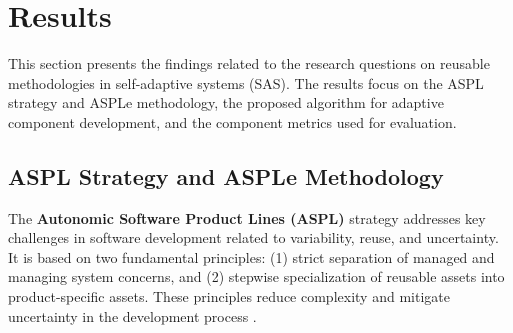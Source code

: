 \documentclass[a4paper,10pt]{article}
\begin{document}








\section{Results}

This section presents the findings related to the research questions on reusable methodologies in self-adaptive systems (SAS). The results focus on the ASPL strategy and ASPLe methodology, the proposed algorithm for adaptive component development, and the component metrics used for evaluation. 

\subsection{ASPL Strategy and ASPLe Methodology}

The \textbf{Autonomic Software Product Lines (ASPL)} strategy addresses key challenges in software development related to variability, reuse, and uncertainty. It is based on two fundamental principles: (1) strict separation of managed and managing system concerns, and (2) stepwise specialization of reusable assets into product-specific assets. These principles reduce complexity and mitigate uncertainty in the development process \cite{Nadeem2020}.
\end{document}
